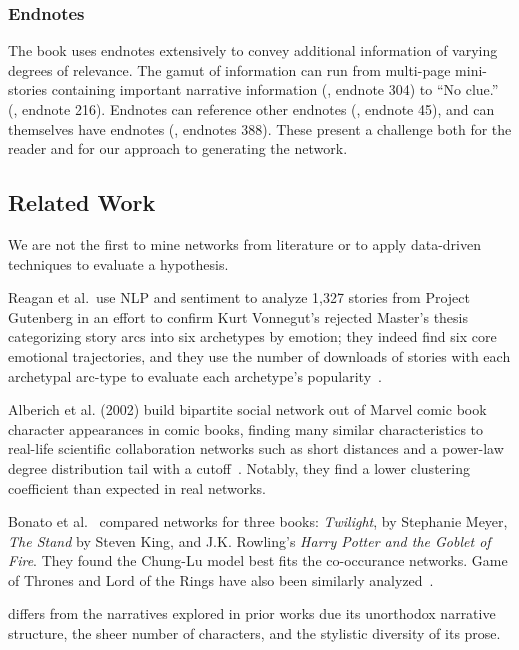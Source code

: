 \subsubsection{Endnotes}

The book uses endnotes extensively to convey additional information of varying degrees of relevance. The gamut of information can run from multi-page mini-stories containing important narrative information (\infinitejest, endnote 304) to ``No clue.'' (\infinitejest, endnote 216). Endnotes can reference other endnotes (\infinitejest, endnote 45), and can themselves have endnotes (\infinitejest, endnotes 388). These present a challenge both for the reader and for our approach to generating the network.

\subsection{Related Work}

We are not the first to mine networks from literature or to apply data-driven techniques to evaluate a hypothesis.

Reagan et al.\ use NLP and sentiment to analyze 1,327 stories from Project Gutenberg in an effort to confirm Kurt Vonnegut's rejected Master's thesis categorizing story arcs into six archetypes by emotion; they indeed find six core emotional trajectories, and they use the number of downloads of stories with each archetypal arc-type to evaluate each archetype's popularity~\cite{Reagan2016}.

Alberich et al. (2002) build bipartite social network out of Marvel comic book character appearances in comic books, finding many similar characteristics to real-life scientific collaboration networks such as short distances and a power-law degree distribution tail with a cutoff~\cite{2002marvel}. Notably, they find a lower clustering coefficient than expected in real networks.

Bonato et al.~\cite{Bonato2016} compared networks for three books: \textit{Twilight}, by Stephanie Meyer, \textit{The Stand} by Steven King, and J.K. Rowling's \textit{Harry Potter and the Goblet of Fire}. They found the Chung-Lu model best fits the co-occurance networks. Game of Thrones and Lord of the Rings have also been similarly analyzed~\cite{GOT,ribeiro2016complex}.

\infinitejest differs from the narratives explored in prior works due its unorthodox narrative structure, the sheer number of characters, and the stylistic diversity of its prose.
